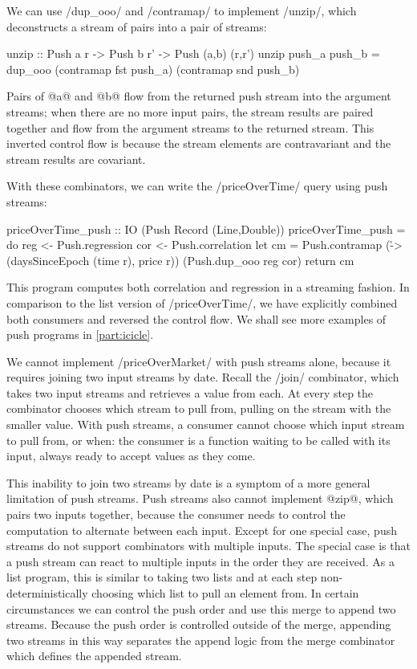 We can use \Hs/dup_ooo/ and \Hs/contramap/ to implement \Hs/unzip/, which deconstructs a stream of pairs into a pair of streams:

\begin{haskell}
unzip :: Push a r -> Push b r' -> Push (a,b) (r,r')
unzip push_a push_b = dup_ooo (contramap fst push_a) (contramap snd push_b)
\end{haskell}

Pairs of @a@ and @b@ flow from the returned push stream into the argument streams; when there are no more input pairs, the stream results are paired together and flow from the argument streams to the returned stream.
This inverted control flow is because the stream elements are contravariant and the stream results are covariant.

With these combinators, we can write the \Hs/priceOverTime/ query using push streams:

\begin{haskell}
priceOverTime_push :: IO (Push Record (Line,Double))
priceOverTime_push = do
  reg   <- Push.regression
  cor   <- Push.correlation
  let cm = Push.contramap
    (\r -> (daysSinceEpoch (time r), price r))
    (Push.dup_ooo reg cor)
  return cm
\end{haskell}

This program computes both correlation and regression in a streaming fashion.
In comparison to the list version of \Hs/priceOverTime/, we have explicitly combined both consumers and reversed the control flow.
We shall see more examples of push programs in \cref{part:icicle}.

We cannot implement \Hs/priceOverMarket/ with push streams alone, because it requires joining two input streams by date.
Recall the \Hs/join/ combinator, which takes two input streams and retrieves a value from each.
At every step the combinator chooses which stream to pull from, pulling on the stream with the smaller value.
With push streams, a consumer cannot choose which input stream to pull from, or when: the consumer is a function waiting to be called with its input, always ready to accept values as they come.

This inability to join two streams by date is a symptom of a more general limitation of push streams.
Push streams also cannot implement @zip@, which pairs two inputs together, because the consumer needs to control the computation to alternate between each input.
Except for one special case, push streams do not support combinators with multiple inputs.
The special case is that a push stream can react to multiple inputs in the order they are received.
As a list program, this is similar to taking two lists and at each step non-deterministically choosing which list to pull an element from.
In certain circumstances we can control the push order and use this merge to append two streams.
Because the push order is controlled outside of the merge, appending two streams in this way separates the append logic from the merge combinator which defines the appended stream.

